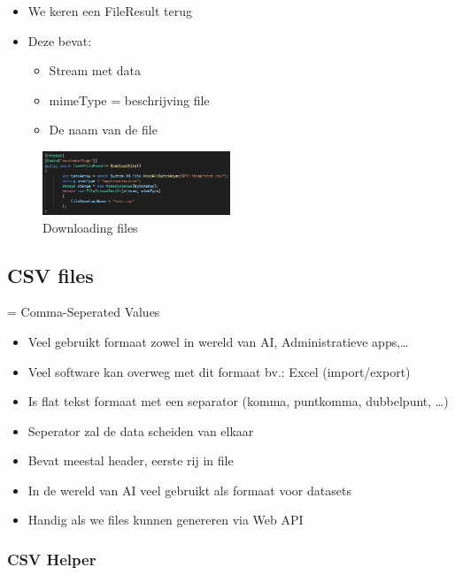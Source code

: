 \documentclass{article}
\begin{document}
\begin{itemize}
    \item We keren een FileResult terug
    \item Deze bevat:
    \begin{itemize}
        \item Stream met data
        \item mimeType = beschrijving file
        \item De naam van de file
    \end{itemize}
\end{itemize}

\begin{figure}[H]
    \centering
    \includegraphics[width=0.5\textwidth]{binary-files-download.png}
    \caption{Downloading files}
\end{figure}

\subsection{CSV files}

= Comma-Seperated Values

\begin{itemize}
    \item Veel gebruikt formaat zowel in wereld van AI, Administratieve apps,…
    \item Veel software kan overweg met dit formaat bv.: Excel (import/export)
    \item Is flat tekst formaat met een separator (komma, puntkomma, dubbelpunt, \dots)
    \item Seperator zal de data scheiden van elkaar
    \item Bevat meestal header, eerste rij in file
    \item In de wereld van AI veel gebruikt als formaat voor datasets
    \item Handig als we files kunnen genereren via Web API
\end{itemize}

\subsubsection{CSV Helper}
\end{document}
